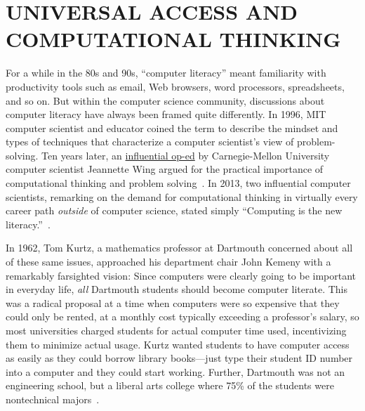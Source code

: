 
\section{UNIVERSAL ACCESS AND COMPUTATIONAL THINKING}




For a while in the 80s and 90s, ``computer literacy'' meant familiarity
with productivity tools such as email, Web browsers, word processors,
spreadsheets, and so on.
But within the computer science community, discussions about computer
literacy have always been framed quite differently.
In 1996, MIT computer scientist and educator  coined
the term  to describe the mindset and types of
techniques that characterize a computer scientist's view of
problem-solving.
Ten years later, an
\href{http://www.cs.cmu.edu/afs/cs/usr/wing/www/publications/Wing06.pdf}{influential
op-ed} by Carnegie-Mellon University computer scientist Jeannette Wing
argued for the practical importance of computational thinking and
problem solving~\cite{wing_computational_thinking}.
In 2013, two influential computer scientists, remarking on the demand
for computational thinking in virtually every career path \emph{outside}
of computer science,
stated simply
``Computing is the new
literacy.''~\cite{ieee_computer_special_issue_computing_education}.

In 1962, Tom Kurtz, a mathematics professor at Dartmouth concerned about
all of these same issues, approached his department chair John Kemeny
with a remarkably farsighted vision: Since computers were clearly going
to be important in everyday life, \emph{all} Dartmouth students should
become computer literate.
This was a radical proposal at a time when computers were so expensive
that they could only be rented, at a monthly cost typically exceeding a
professor's salary, so most universities charged students for actual
computer time used, incentivizing them to minimize actual usage.
Kurtz wanted students to have computer access as easily as they could
borrow library books---just type their student ID number into a
computer and they could start working.
Further, Dartmouth was not an engineering school, but a liberal arts
college where 75\% of the students were nontechnical majors~\cite{goto}.

